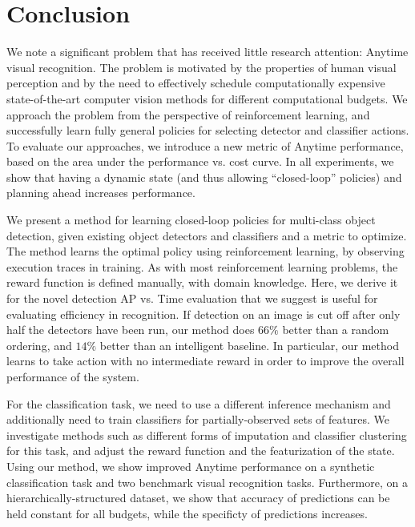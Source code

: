 \chapter{Conclusion}\label{sec:conclusion}

We note a significant problem that has received little research attention: Anytime visual recognition.
The problem is motivated by the properties of human visual perception and by the need to effectively schedule computationally expensive state-of-the-art computer vision methods for different computational budgets.
We approach the problem from the perspective of reinforcement learning, and successfully learn fully general policies for selecting detector and classifier actions.
To evaluate our approaches, we introduce a new metric of Anytime performance, based on the area under the performance vs. cost curve.
In all experiments, we show that having a dynamic state (and thus allowing ``closed-loop'' policies) and planning ahead increases performance.

We present a method for learning closed-loop policies for multi-class object detection, given existing object detectors and classifiers and a metric to optimize.
The method learns the optimal policy using reinforcement learning, by observing execution traces in training.
As with most reinforcement learning problems, the reward function is defined manually, with domain knowledge.
Here, we derive it for the novel detection AP vs. Time evaluation that we suggest is useful for evaluating efficiency in recognition.
If detection on an image is cut off after only half the detectors have been run, our method does $66\%$ better than a random ordering, and $14\%$ better than an intelligent baseline.
In particular, our method learns to take action with no intermediate reward in order to improve the overall performance of the system.

For the classification task, we need to use a different inference mechanism and additionally need to train classifiers for partially-observed sets of features.
We investigate methods such as different forms of imputation and classifier clustering for this task, and adjust the reward function and the featurization of the state.
Using our method, we show improved Anytime performance on a synthetic classification task and two benchmark visual recognition tasks.
Furthermore, on a hierarchically-structured dataset, we show that accuracy of predictions can be held constant for all budgets, while the specificty of predictions increases.


